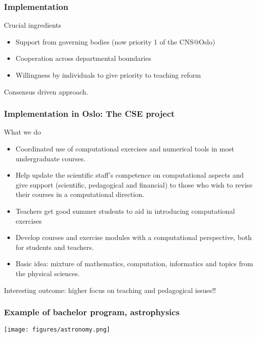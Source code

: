 \documentclass{beamer}
\begin{document}
\begin{frame}
\frametitle{Implementation}

\begin{block}{Crucial ingredients }

\begin{itemize}
\item Support from governing bodies (now priority 1 of the CNS@Oslo)

\item Cooperation across departmental boundaries

\item Willingness by individuals to give priority to teaching reform
\end{itemize}

\noindent
Consensus driven approach.
\end{block}
\end{frame}

\begin{frame}
\frametitle{Implementation in Oslo: The CSE  project}

\begin{block}{What we do }
\begin{itemize}
\item Coordinated use of computational exercises and numerical tools in most undergraduate courses.

\item Help update the scientific staff's competence on computational aspects and give support (scientific, pedagogical and financial)  to those who wish to revise  their courses in a computational direction.

\item Teachers get good summer students to aid in introducing computational exercises

\item Develop courses and exercise modules with a computational perspective, both for students and teachers. 

\item Basic idea: mixture of mathematics, computation, informatics and topics from the physical sciences.
\end{itemize}

\noindent
Interesting outcome: higher focus on teaching and pedagogical issues!!
\end{block}
\end{frame}

\begin{frame}
\frametitle{Example of bachelor program, astrophysics}

\begin{block}{}


\centerline{\texttt{[image: figures/astronomy.png]}}




\end{block}
\end{frame}
\end{document}
